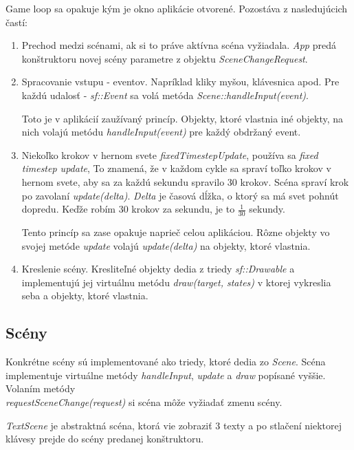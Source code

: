 \documentclass[12pt]{article}
\begin{document}
Game loop sa opakuje kým je okno aplikácie otvorené. Pozostáva z nasledujúcich častí:

\begin{enumerate}
    \item Prechod medzi scénami, ak si to práve aktívna scéna vyžiadala. \emph{App} predá
    konštruktoru novej scény parametre z objektu \emph{SceneChangeRequest}.
    \item Spracovanie vstupu - eventov. Napríklad kliky myšou, klávesnica apod.
    Pre každú udalosť - \emph{sf::Event} sa volá metóda \emph{Scene::handleInput(event)}.
    

    Toto je v aplikácií zaužívaný princíp. Objekty, ktoré vlastnia iné objekty,
    na nich volajú metódu \emph{handleInput(event)} pre každý obdržaný event.
    \item Niekoľko krokov v hernom svete \emph{fixedTimestepUpdate}, používa sa \emph{fixed timestep update},
    To znamená, že v každom cykle sa spraví toľko krokov v hernom svete, aby sa za každú sekundu spravilo 30 krokov.
    Scéna spraví krok po zavolaní \emph{update(delta)}. \emph{Delta} je časová dĺžka,
    o ktorý sa má svet pohnút dopredu. Keďže robím 30 krokov za sekundu, je to $\frac{1}{30}$ sekundy.
    
    
    Tento princíp sa zase opakuje naprieč celou aplikáciou. Rôzne objekty vo svojej metóde
    \emph{update} volajú \emph{update(delta)} na objekty, ktoré vlastnia.
    \item Kreslenie scény. Kresliteľné objekty dedia z triedy \emph{sf::Drawable} a implementujú
    jej virtuálnu metódu \emph{draw(target, states)} v ktorej vykreslia seba a objekty, ktoré vlastnia.
\end{enumerate}

\subsection{Scény}
Konkrétne scény sú implementované ako triedy, ktoré dedia zo \emph{Scene}. 
Scéna implementuje virtuálne metódy \emph{handleInput}, \emph{update} a \emph{draw} popísané
vyššie. Volaním metódy \\
\emph{requestSceneChange(request)} si scéna môže vyžiadať zmenu scény.


\emph{TextScene} je abstraktná scéna, ktorá vie zobraziť 3 texty a po stlačení niektorej
klávesy prejde do scény predanej konštruktoru.
\end{document}
